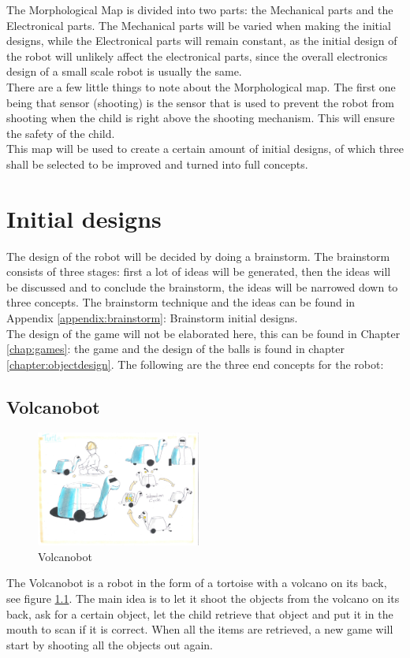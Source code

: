 \documentclass[11pt,twoside,a4paper]{report}
\begin{document}
The Morphological Map is divided into two parts: the Mechanical parts and the Electronical parts. The Mechanical parts will be varied when making the initial designs, while the Electronical parts will remain constant, as the initial design of the robot will unlikely affect the electronical parts, since the overall electronics design of a small scale robot is usually the same. \\
There are a few little things to note about the Morphological map. The first one being that sensor (shooting) is the sensor that is used to prevent the robot from shooting when the child is right above the shooting mechanism. This will ensure the safety of the child. \\
This map will be used to create a certain amount of initial designs, of which three shall be selected to be improved and turned into full concepts.
\label{chap:morphological}

\chapter{Initial designs}
The design of the robot will be decided by doing a brainstorm. The brainstorm consists of three stages: first a lot of ideas will be generated, then the ideas will be discussed and to conclude the brainstorm, the ideas will be narrowed down to three concepts. The brainstorm technique and the ideas can be found in Appendix \ref{appendix:brainstorm}: Brainstorm initial designs. \\
The design of the game will not be elaborated here, this can be found in Chapter \ref{chap:games}: the game and the design of the balls is found in chapter \ref{chapter:objectdesign}. The following are the three end concepts for the robot:

\section{Volcanobot}
\begin{figure}
  \begin{center}
    \includegraphics[width=0.48\textwidth]{Images/VolcanoBotConcept.pdf}
  \end{center}
  \caption{Volcanobot}
  \label{figure:volcanobot}
\end{figure}
The Volcanobot is a robot in the form of a tortoise with a volcano on its back, see figure \ref{figure:volcanobot}. The main idea is to let it shoot the objects from the volcano on its back, ask for a certain object, let the child retrieve that object and put it in the mouth to scan if it is correct. When all the items are retrieved, a new game will start by shooting all the objects out again.
\end{document}
